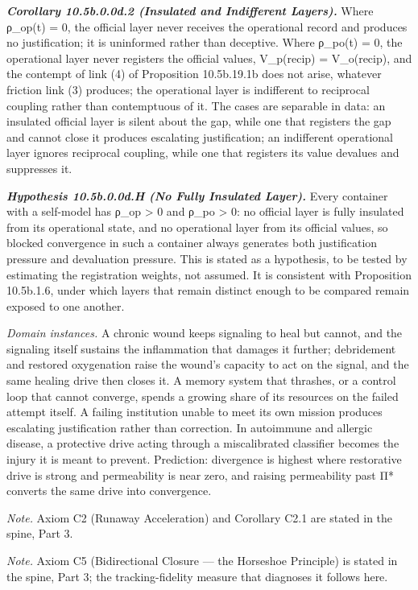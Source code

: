 \documentclass[
]{article}
\begin{document}
\emph{\textbf{Corollary 10.5b.0.0d.2 (Insulated and Indifferent
Layers).}} Where ρ\_op(t) = 0, the official layer never receives the
operational record and produces no justification; it is uninformed
rather than deceptive. Where ρ\_po(t) = 0, the operational layer never
registers the official values, V\_p(recip) = V\_o(recip), and the
contempt of link (4) of Proposition 10.5b.19.1b does not arise, whatever
friction link (3) produces; the operational layer is indifferent to
reciprocal coupling rather than contemptuous of it. The cases are
separable in data: an insulated official layer is silent about the gap,
while one that registers the gap and cannot close it produces escalating
justification; an indifferent operational layer ignores reciprocal
coupling, while one that registers its value devalues and suppresses it.

\emph{\textbf{Hypothesis 10.5b.0.0d.H (No Fully Insulated Layer).}}
Every container with a self-model has ρ\_op \textgreater{} 0 and ρ\_po
\textgreater{} 0: no official layer is fully insulated from its
operational state, and no operational layer from its official values, so
blocked convergence in such a container always generates both
justification pressure and devaluation pressure. This is stated as a
hypothesis, to be tested by estimating the registration weights, not
assumed. It is consistent with Proposition 10.5b.1.6, under which layers
that remain distinct enough to be compared remain exposed to one
another.

\emph{Domain instances.} A chronic wound keeps signaling to heal but
cannot, and the signaling itself sustains the inflammation that damages
it further; debridement and restored oxygenation raise the wound's
capacity to act on the signal, and the same healing drive then closes
it. A memory system that thrashes, or a control loop that cannot
converge, spends a growing share of its resources on the failed attempt
itself. A failing institution unable to meet its own mission produces
escalating justification rather than correction. In autoimmune and
allergic disease, a protective drive acting through a miscalibrated
classifier becomes the injury it is meant to prevent. Prediction:
divergence is highest where restorative drive is strong and permeability
is near zero, and raising permeability past Π* converts the same drive
into convergence.

\emph{Note.} Axiom C2 (Runaway Acceleration) and Corollary C2.1 are
stated in the spine, Part 3.

\emph{Note.} Axiom C5 (Bidirectional Closure --- the Horseshoe
Principle) is stated in the spine, Part 3; the tracking-fidelity measure
that diagnoses it follows here.
\end{document}
